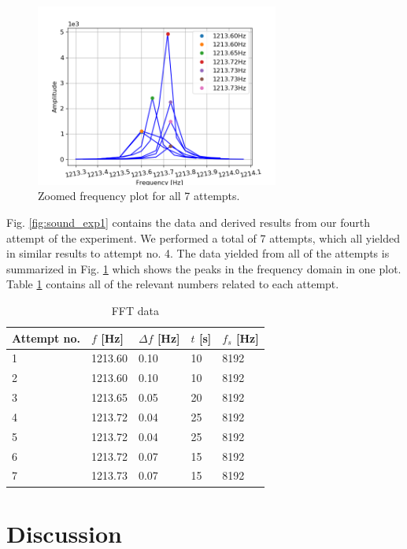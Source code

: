 \documentclass[%
 reprint,
 amsmath,amssymb,
 aps,
]{revtex4-1}
\begin{document}
    \begin{figure}[h!]
      \centering 
      \includegraphics[width=8cm]{scripts/freq_exp2_all.png}
      \caption{Zoomed frequency plot for all 7 attempts.}
      \label{fig:sound_all}
    \end{figure}
    
    Fig. \ref{fig:sound_exp1} contains the data and derived results from our fourth attempt of the experiment. We performed a total of 7 attempts, which all yielded in similar results to attempt no. 4. The data yielded from all of the attempts is summarized in Fig. \ref{fig:sound_all} which shows the peaks in the frequency domain in one plot.
    Table \ref{tab:fftdat} contains all of the relevant numbers related to each attempt. 


    \begin{table}[h!]
      \center
      \caption{FFT data}
      \begin{tabular}{ | l | p{1.4cm} | l | l | l |}
          \hline
          Attempt no. & $f$ [Hz] & $\Delta f$ [Hz] & $t$ [s] & $f_s$ [Hz]\\ \hline
          1 & 1213.60 & 0.10 & 10 & 8192\\ \hline
          2 & 1213.60 & 0.10 & 10 & 8192\\ \hline
          3 & 1213.65 & 0.05 & 20 & 8192\\ \hline
          4 & 1213.72 & 0.04 & 25 & 8192\\ \hline
          5 & 1213.72 & 0.04 & 25 & 8192\\ \hline
          6 & 1213.72 & 0.07 & 15 & 8192\\ \hline
          7 & 1213.73 & 0.07 & 15 & 8192\\ \hline
      \end{tabular}
      \label{tab:fftdat}
    \end{table}


\newpage
\section{\label{sect:discussion}Discussion}
 
\end{document}

